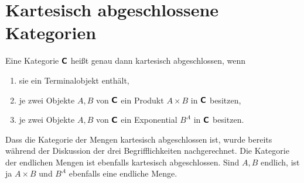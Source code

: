 \newpage
\section{Kartesisch abgeschlossene Kategorien}

\begin{Definition}\newlinefirst
Eine Kategorie $\textsf{\textbf{C}}$ heißt genau dann kartesisch abgeschlossen,
wenn
\begin{enumerate}[nosep]
\item sie ein Terminalobjekt enthält,
\item je zwei Objekte $A,B$ von $\textsf{\textbf{C}}$ ein Produkt
  $A\times B$ in $\textsf{\textbf{C}}$ besitzen,
\item je zwei Objekte $A,B$ von $\textsf{\textbf{C}}$ ein Exponential
  $B^A$ in $\textsf{\textbf{C}}$ besitzen.
\end{enumerate}
\end{Definition}

\noindent
Dass die Kategorie der Mengen kartesisch abgeschlossen ist, wurde
bereits während der Diskussion der drei Begrifflichkeiten
nachgerechnet. Die Kategorie der endlichen Mengen ist ebenfalls
kartesisch abgeschlossen. Sind $A,B$ endlich, ist ja $A\times B$
und $B^A$ ebenfalls eine endliche Menge.


